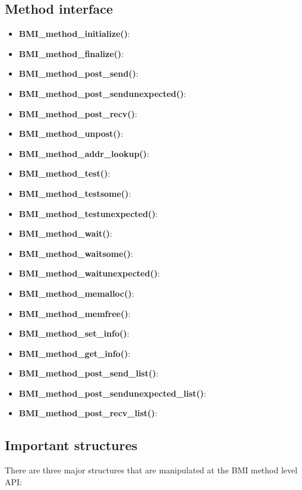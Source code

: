\documentclass[11pt]{article}
\begin{document}
\subsection{Method interface}

\begin{itemize}

\item \textbf{BMI\_method\_initialize()}:
\item \textbf{BMI\_method\_finalize()}:
\item \textbf{BMI\_method\_post\_send()}:
\item \textbf{BMI\_method\_post\_sendunexpected()}:
\item \textbf{BMI\_method\_post\_recv()}:
\item \textbf{BMI\_method\_unpost()}: 
\item \textbf{BMI\_method\_addr\_lookup()}:
\item \textbf{BMI\_method\_test()}: 
\item \textbf{BMI\_method\_testsome()}: 
\item \textbf{BMI\_method\_testunexpected()}:
\item \textbf{BMI\_method\_wait()}: 
\item \textbf{BMI\_method\_waitsome()}: 
\item \textbf{BMI\_method\_waitunexpected()}:
\item \textbf{BMI\_method\_memalloc()}:
\item \textbf{BMI\_method\_memfree()}:
\item \textbf{BMI\_method\_set\_info()}:
\item \textbf{BMI\_method\_get\_info()}:
\item \textbf{BMI\_method\_post\_send\_list()}:
\item \textbf{BMI\_method\_post\_sendunexpected\_list()}:
\item \textbf{BMI\_method\_post\_recv\_list()}:

\end{itemize}

\subsection{Important structures}

There are three major structures that are manipulated at the BMI
method level API:
\end{document}
